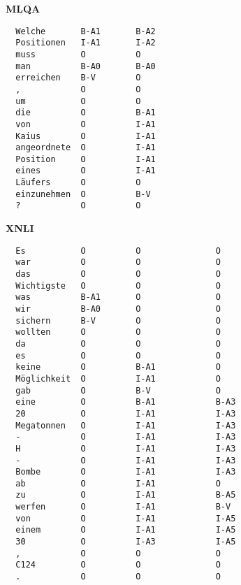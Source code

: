 \textbf{MLQA}

\begin{verbatim}
  Welche       B-A1       B-A2
  Positionen   I-A1       I-A2
  muss         O          O
  man          B-A0       B-A0
  erreichen    B-V        O
  ,            O          O
  um           O          O
  die          O          B-A1
  von          O          I-A1
  Kaius        O          I-A1
  angeordnete  O          I-A1
  Position     O          I-A1
  eines        O          I-A1
  Läufers      O          O
  einzunehmen  O          B-V
  ?            O          O
\end{verbatim}

\textbf{XNLI}

\begin{verbatim}
  Es           O          O               O
  war          O          O               O
  das          O          O               O
  Wichtigste   O          O               O
  was          B-A1       O               O
  wir          B-A0       O               O
  sichern      B-V        O               O
  wollten      O          O               O
  da           O          O               O
  es           O          O               O
  keine        O          B-A1            O
  Möglichkeit  O          I-A1            O
  gab          O          B-V             O
  eine         O          B-A1            B-A3
  20           O          I-A1            I-A3
  Megatonnen   O          I-A1            I-A3
  -            O          I-A1            I-A3
  H            O          I-A1            I-A3
  -            O          I-A1            I-A3
  Bombe        O          I-A1            I-A3
  ab           O          I-A1            O
  zu           O          I-A1            B-A5
  werfen       O          I-A1            B-V
  von          O          I-A1            I-A5
  einem        O          I-A1            I-A5
  30           O          I-A3            I-A5
  ,            O          O               O
  C124         O          O               O
  .            O          O               O
\end{verbatim}


